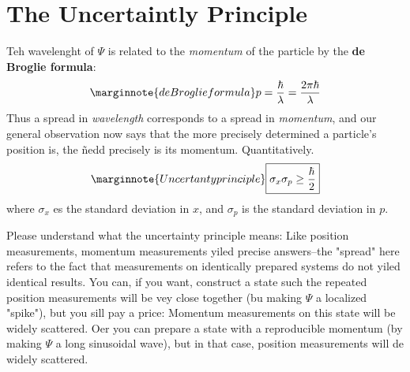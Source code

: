 \section{The Uncertaintly Principle}
Teh wavelenght of $\Psi$ is related to the \textit{momentum} of the particle by the \textbf{de Broglie formula}:
\begin{equation}\label{1.39}\marginnote{deBroglie formula}
	p=\frac{\hbar}{\lambda}=\frac{2\pi\hbar}{\lambda}
\end{equation}
Thus a spread in \textit{wavelength} corresponds to a spread in \textit{momentum}, and our general observation now says that the more precisely determined a particle's position is, the ñedd precisely is its momentum. Quantitatively.
\begin{equation}\label{1.40}\marginnote{Uncertanty principle}
	\boxed{\sigma_x\sigma_p\geq\frac{\hbar}{2}}
\end{equation}
where $\sigma_x$ es the standard deviation in $x$, and $\sigma_p$ is the standard deviation in $p$.

Please understand what the uncertainty principle means: Like position measurements, momentum measurements yiled precise answers--the "spread" here refers to the fact that measurements on identically prepared systems do not yiled identical results. You can, if you want, construct a state such the repeated position measurements will be vey close together (bu making $\Psi$ a localized "spike"), but you sill pay a price: Momentum measurements on this state will be widely scattered. Oer you can prepare a state with a reproducible momentum (by making $\Psi$ a long sinusoidal wave), but in that case, position measurements will de widely scattered.
